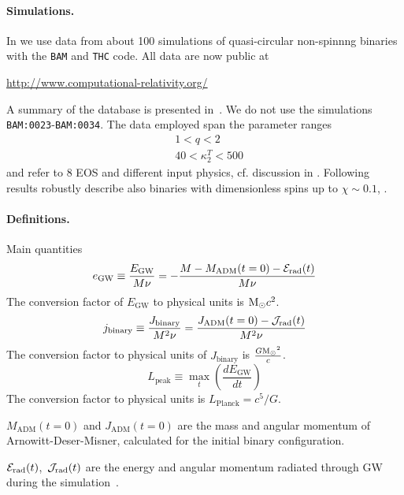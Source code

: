 \documentclass[aps,prl,onecolumn,superscriptaddress,groupedaddress,nofootinbib,floatfix,notitlepage]{revtex4-1}
\newcommand{\be}{\begin{equation}}
\newcommand{\ee}{\end{equation}}
\newcommand{\stext}[1]{\text{#1}}
\def\Msun{{\rm M_{\odot}}}
\begin{document}
\paragraph*{\bf Simulations.}
In \cite{Zappa:2017xba} we use data from about 100 simulations of
quasi-circular non-spinnng binaries with the {\tt BAM} and {\tt THC}
code. All data are now public at
\begin{center}
  \url{http://www.computational-relativity.org/}
\end{center}
A summary of the database is presented in~\cite{Dietrich:2018phi}.
We do not use the simulations {\tt BAM:0023}-{\tt BAM:0034}.
The data employed span the parameter ranges
\begin{align}
&1 < q < 2\\ 
& 40 < \kappa^T_2 < 500
\end{align}
and refer to 8 EOS and different input physics, cf. discussion
in \cite{Zappa:2017xba}. Following results robustly describe also
binaries with dimensionless spins up to $\chi\sim0.1$, \cite{Zappa:2017xba}. 

\paragraph*{\bf Definitions.} Main quantities
\be
e_\stext{GW} \equiv \frac{E_\stext{GW}}{M \nu} = - \frac{M-M_\stext{ADM}(t=0) - {\cal E}_\stext{rad}(t)}{M\nu}
\ee
The conversion factor of $E_\stext{GW}$ to physical units is $\Msun c^2$.
\be
j_\stext{binary} \equiv \frac{J_\stext{binary}}{M^2\nu} = \frac{J_\stext{ADM}(t=0) - {\cal J}_\stext{rad}(t)}{M^2\nu}
\ee
The conversion factor to physical units of $J_\stext{binary}$ is $\frac{G\Msun^2}{c}$.
\be
L_\stext{peak} \equiv \max_t \left( \frac{dE_\stext{GW}}{dt} \right)
\ee
The conversion factor to physical units is $L_\stext{Planck} = c^5/G$.

$M_\stext{ADM}(t=0)$ and $J_\stext{ADM}(t=0)$ are the mass and angular momentum of Arnowitt-Deser-Misner, calculated for
the initial binary configuration.

${\cal E}_\stext{rad}(t)$,~${\cal J}_\stext{rad}(t)$ are the energy and angular momentum radiated through GW during the simulation~\cite{Damour:2011fu}.
 
\end{document}
